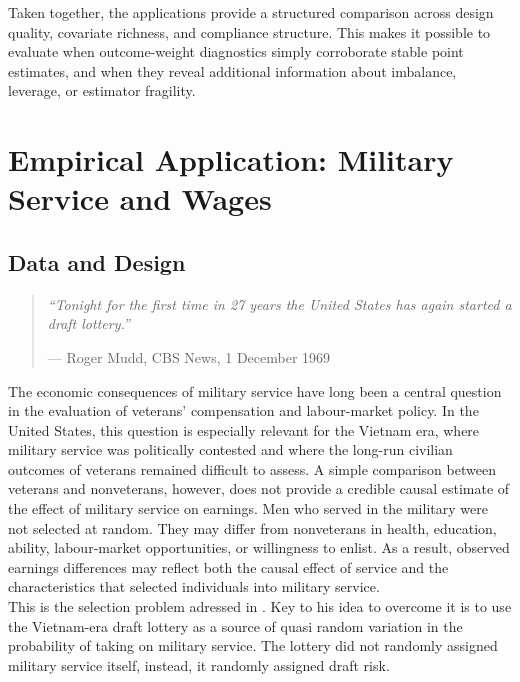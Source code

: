 \documentclass[12pt, a4paper, oneside]{article}
\theoremstyle{plain}
\theoremstyle{definition}
\begin{document}
Taken together, the applications provide a structured comparison across design quality, covariate richness, and compliance structure. This makes it possible to evaluate when outcome-weight diagnostics simply corroborate stable point estimates, and when they reveal additional information about imbalance, leverage, or estimator fragility.

\newpage



\section{Empirical Application: Military Service and Wages}
\label{sec:vietnam}

\subsection{Data and Design}
\label{subsec:vietnam_data}
\begin{quotation}
\noindent\textit{``Tonight for the first time in 27 years the United
States has again started a draft lottery.''}

\smallskip
\noindent\hfill --- Roger Mudd, CBS News, 1 December 1969
\end{quotation}
The economic consequences of military service have long been a central question in the evaluation of veterans' compensation and labour-market policy. In the United States, this question is especially relevant for the Vietnam era, where military service was politically contested and where the long-run civilian outcomes of veterans remained difficult to assess. A simple comparison between veterans and nonveterans, however, does not provide a credible causal estimate of the effect of military service on earnings. Men who served in the military were not selected at random. They may differ from nonveterans in health, education, ability, labour-market opportunities, or willingness to enlist. As a result, observed earnings differences may reflect both the causal effect of service and the characteristics that selected individuals into military service.\\
This is the selection problem adressed in \citet{angrist1990lifetime}.
Key to his idea to overcome it is to use the Vietnam-era draft lottery as a source of quasi random variation in the probability of taking on military service. 
The lottery did not randomly assigned military service itself, instead, it randomly assigned draft risk.
\end{document}
